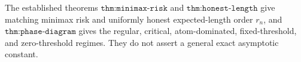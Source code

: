 The established theorems \(\texttt{thm:minimax-risk}\) and \(\texttt{thm:honest-length}\) give matching minimax risk and uniformly honest expected-length order \(r_n\), and \(\texttt{thm:phase-diagram}\) gives the regular, critical, atom-dominated, fixed-threshold, and zero-threshold regimes. They do not assert a general exact asymptotic constant.